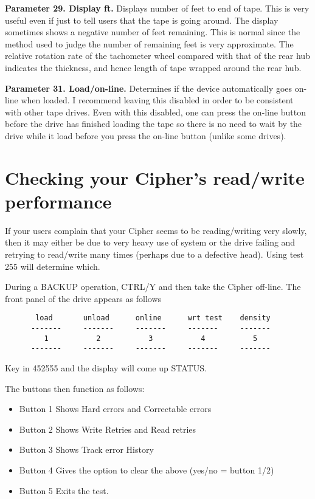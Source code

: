 {\bf Parameter 29. Display ft.} Displays number of feet to end of tape. This is very useful
even if just to tell users that  the tape is going around.
The display sometimes shows a negative number of feet remaining.
This is normal since the method used to judge the number of remaining feet is
very approximate. The relative rotation rate of the tachometer wheel compared
with that of the rear hub indicates the thickness, 
and hence length of tape wrapped around the rear hub.

{\bf Parameter 31. Load/on-line.} Determines if the device automatically goes on-line when
loaded. I recommend leaving this disabled in order to be consistent with other
tape drives. Even with this disabled, one can press the on-line button
before the drive has finished loading the tape so there is no need to 
wait by the drive while it load before you press the on-line button
(unlike some drives).


\section{Checking your Cipher's read/write performance}

If your users complain that your Cipher seems to be 
reading/writing very slowly, then it may either be due to 
very heavy use of system or the drive failing and retrying to read/write 
many times (perhaps due to a defective head). Using test 255 will 
determine which.

During a BACKUP operation, CTRL/Y and then take the Cipher off-line.
The front panel of the drive appears as follows

\begin{verbatim}
       load       unload      online      wrt test    density
      -------     -------     -------     -------     -------
         1           2           3           4           5 
      -------     -------     -------     -------     -------
\end{verbatim}

Key in 452555 and the display will come up STATUS.

The buttons then function as follows:

\begin{itemize}

\item Button 1 \qquad	Shows Hard errors and Correctable errors

\item Button 2 \qquad	Shows Write Retries and Read retries

\item Button 3 \qquad	Shows Track error History

\item Button 4 \qquad	Gives the option to clear the above (yes/no = button 1/2)

\item Button 5 \qquad	Exits the test.

\end{itemize}

